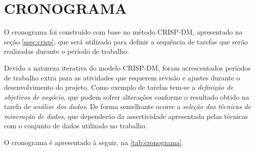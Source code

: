 
\chapter{CRONOGRAMA}

O cronograma foi construído com base no método CRISP-DM, apresentado na seção \ref{ssec:crisp}, que será utilizado para definir a sequência de tarefas que serão realizadas durante o período de trabalho. 

Devido a natureza iterativa do modelo CRISP-DM, foram acrescentados períodos de trabalho extra para as atividades que requerem revisão e ajustes durante o desenvolvimento do projeto.
Como exemplo de tarefas tem-se a \textit{definição de objetivos de negócio}, que podem sofrer alterações conforme o resultado obtido na tarefa de \textit{análise dos dados}. 
De forma semelhante ocorre a \textit{seleção das técnicas de mineração de dados}, que dependerão da assertividade apresentada pelas técnicas com o conjunto de dados utilizado no trabalho.

O cronograma é apresentado à seguir, na \autoref{tab:cronograma}.



